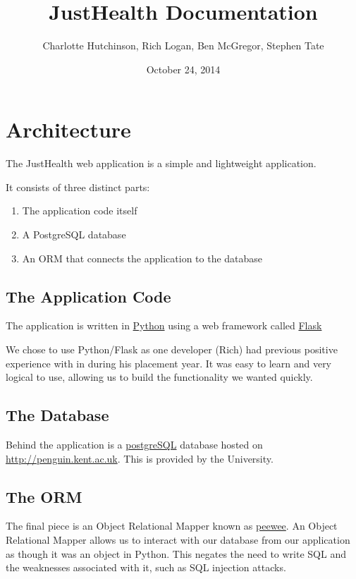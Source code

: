 \documentclass[letterpaper,10pt,english]{sphinxmanual}
\title{JustHealth Documentation}
\date{October 24, 2014}
\author{Charlotte Hutchinson, Rich Logan, Ben McGregor, Stephen Tate}
\begin{document}
\maketitle
\tableofcontents
{}\label{index::doc}



\chapter{Architecture}
\label{docs/arch::doc}\label{docs/arch:architecture}\label{docs/arch:welcome-to-justhealth-s-documentation}
The JustHealth web application is a simple and lightweight application.

It consists of three distinct parts:
\begin{enumerate}
\item {} 
The application code itself

\item {} 
A PostgreSQL database

\item {} 
An ORM that connects the application to the database

\end{enumerate}


\section{The Application Code}
\label{docs/arch:the-application-code}
The application is written in \href{https://www.python.org/}{Python} using a web framework called \href{http://flask.pocoo.org/}{Flask}

We chose to use Python/Flask as one developer (Rich) had previous positive experience with in during his placement year. It was easy to learn and very logical to use, allowing us to build the functionality we wanted quickly.


\section{The Database}
\label{docs/arch:the-database}
Behind the application is a \href{http://www.postgresql.org/}{postgreSQL} database hosted on \href{http://penguin.kent.ac.uk}{http://penguin.kent.ac.uk}. This is provided by the University.


\section{The ORM}
\label{docs/arch:the-orm}
The final piece is an Object Relational Mapper known as \href{https://github.com/coleifer/peewee}{peewee}. An Object Relational Mapper allows us to interact with our database from our application as though it was an object in Python. This negates the need to write SQL and the weaknesses associated with it, such as SQL injection attacks.
\end{document}
